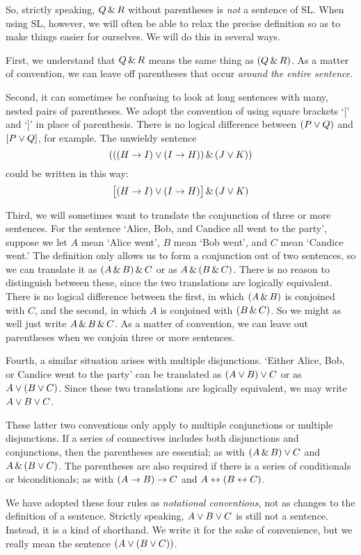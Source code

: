 So, strictly speaking, $Q \,\&\, R$ without parentheses is \emph{not} a sentence of SL. When using SL, however, we will often be able to relax the precise definition so as to make things easier for ourselves. We will do this in several ways.

First,  we understand that $Q \,\&\, R$ means the same thing as $(Q \,\&\, R)$. As a matter of convention, we can leave off parentheses that occur \emph{around the entire sentence}.

Second, it can sometimes be confusing to look at long sentences with many, nested pairs of parentheses. We adopt the convention of using square brackets `[' and `]' in place of parenthesis. There is no logical difference between $(P\vee Q)$ and $[P\vee Q]$, for example. The unwieldy sentence
$$(((H \rightarrow I) \vee (I \rightarrow H)) \,\&\, (J \vee K))$$
could be written in this way:
$$\bigl[(H \rightarrow I) \vee (I \rightarrow H)\bigr] \,\&\, (J \vee K)$$


Third, we will sometimes want to translate the conjunction of three or more sentences. For the sentence `Alice, Bob, and Candice all went to the party', suppose we let $A$ mean `Alice went', $B$ mean `Bob went', and $C$ mean `Candice went.' The definition only allows us to form a conjunction out of two sentences, so we can translate it as $(A \,\&\, B) \,\&\, C$ or as $A \,\&\, (B \,\&\, C)$. There is no reason to distinguish between these, since the two translations are logically equivalent. There is no logical difference between the first, in which $(A \,\&\, B)$ is conjoined with $C$, and the second, in which $A$ is conjoined with $(B \,\&\, C)$.  So we might as well just write $A \,\&\, B \,\&\, C$. As a matter of convention, we can leave out parentheses when we conjoin three or more sentences.

Fourth, a similar situation arises with multiple disjunctions. `Either Alice, Bob, or Candice went to the party' can be translated as $(A \vee B) \vee C$ or as $A \vee (B \vee C)$. Since these two translations are logically equivalent, we may write $A \vee B \vee C$.

These latter two conventions only apply to multiple conjunctions or multiple  disjunctions. If a series of connectives includes both disjunctions and conjunctions, then the parentheses are essential; as with $(A \,\&\, B) \vee C$ and $A \,\&\, (B \vee C)$. The parentheses are also required if there is a series of conditionals or biconditionals; as with $(A \rightarrow B) \rightarrow C$ and $A \leftrightarrow (B \leftrightarrow C)$.

We have adopted these four rules as \emph{notational conventions}, not as changes to the definition of a sentence. Strictly speaking, $A \vee B \vee C$ is still not a sentence. Instead, it is a kind of shorthand. We write it for the sake of convenience, but we really mean the sentence $(A \vee (B \vee C))$.

